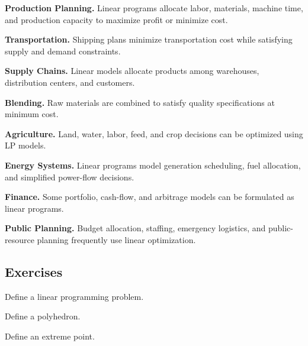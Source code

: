 \begin{applicationbox}

\textbf{Production Planning.}
Linear programs allocate labor, materials, machine time, and production
capacity to maximize profit or minimize cost.

\medskip

\textbf{Transportation.}
Shipping plans minimize transportation cost while satisfying supply and
demand constraints.

\medskip

\textbf{Supply Chains.}
Linear models allocate products among warehouses, distribution centers,
and customers.

\medskip

\textbf{Blending.}
Raw materials are combined to satisfy quality specifications at minimum
cost.

\medskip

\textbf{Agriculture.}
Land, water, labor, feed, and crop decisions can be optimized using LP
models.

\medskip

\textbf{Energy Systems.}
Linear programs model generation scheduling, fuel allocation, and
simplified power-flow decisions.

\medskip

\textbf{Finance.}
Some portfolio, cash-flow, and arbitrage models can be formulated as
linear programs.

\medskip

\textbf{Public Planning.}
Budget allocation, staffing, emergency logistics, and public-resource
planning frequently use linear optimization.

\end{applicationbox}

\subsection{Exercises}
\label{subsec:linear-programming-exercises}

\begin{exercise}[1]
Define a linear programming problem.
\end{exercise}

\begin{exercise}[1]
Define a polyhedron.
\end{exercise}

\begin{exercise}[1]
Define an extreme point.
\end{exercise}

